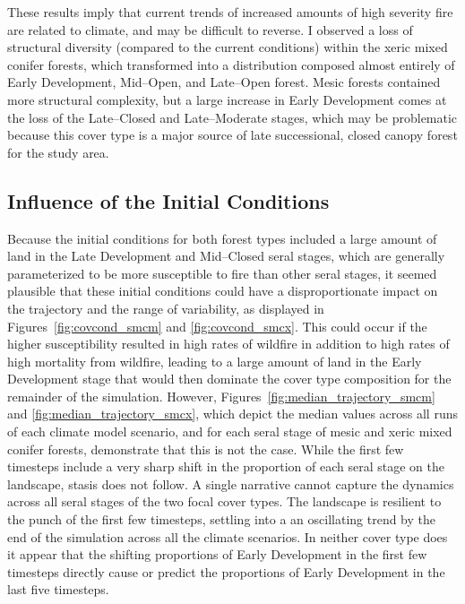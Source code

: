 These results imply that current trends of increased amounts of high severity fire \citep{Miller2012,Mallek2013} are related to climate, and may be difficult to reverse. I observed a loss of structural diversity (compared to the current conditions) within the xeric mixed conifer forests, which transformed into a distribution composed almost entirely of Early Development, Mid--Open, and Late--Open forest. Mesic forests contained more structural complexity, but a large increase in Early Development comes at the loss of the Late--Closed and Late--Moderate stages, which may be problematic because this cover type is a major source of late successional, closed canopy forest for the study area.

\subsection{Influence of the Initial Conditions}
Because the initial conditions for both forest types included a large amount of land in the Late Development and Mid--Closed seral stages, which are generally parameterized to be more susceptible to fire than other seral stages, it seemed plausible that these initial conditions could have a disproportionate impact on the trajectory and the range of variability, as displayed in Figures~\ref{fig:covcond_smcm} and \ref{fig:covcond_smcx}. This could occur if the higher susceptibility resulted in high rates of wildfire in addition to high rates of high mortality from wildfire, leading to a large amount of land in the Early Development stage that would then dominate the cover type composition for the remainder of the simulation. However, Figures~\ref{fig:median_trajectory_smcm} and \ref{fig:median_trajectory_smcx}, which depict the median values across all runs of each climate model scenario, and for each seral stage of mesic and xeric mixed conifer forests, demonstrate that this is not the case. While the first few timesteps include a very sharp shift in the proportion of each seral stage on the landscape, stasis does not follow. A single narrative cannot capture the dynamics across all seral stages of the two focal cover types. The landscape is resilient to the punch of the first few timesteps, settling into a an oscillating trend by the end of the simulation across all the climate scenarios. In neither cover type does it appear that the shifting proportions of Early Development in the first few timesteps directly cause or predict the proportions of Early Development in the last five timesteps.

